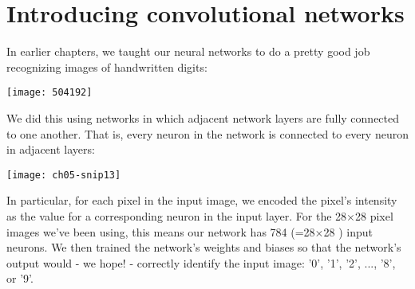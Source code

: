 \section{Introducing convolutional networks}

In earlier chapters, we taught our neural networks to do a pretty good job recognizing images of handwritten digits:
\begin{marginfigure}
    \texttt{[image: 504192]}
    \end{marginfigure}

We did this using networks in which adjacent network layers are fully connected to one another. That is, every neuron in the network is connected to every neuron in adjacent layers:

\begin{figure*}[tph]
    \texttt{[image: ch05-snip13]}
    \end{figure*}

In particular, for each pixel in the input image, we encoded the pixel's intensity as the value for a corresponding neuron in the input layer. For the 28$\times$28 pixel images we've been using, this means our network has 784 (=28$\times$28 ) input neurons. We then trained the network's weights and biases so that the network's output would - we hope! - correctly identify the input image: '0', '1', '2', ..., '8', or '9'.



